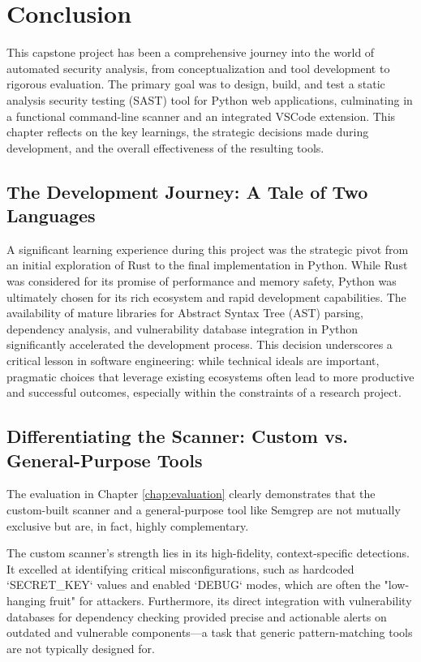 \chapter{Conclusion}
\label{chap:conclusion}

This capstone project has been a comprehensive journey into the world of automated security analysis, from conceptualization and tool development to rigorous evaluation. The primary goal was to design, build, and test a static analysis security testing (SAST) tool for Python web applications, culminating in a functional command-line scanner and an integrated VSCode extension. This chapter reflects on the key learnings, the strategic decisions made during development, and the overall effectiveness of the resulting tools.

\section{The Development Journey: A Tale of Two Languages}

A significant learning experience during this project was the strategic pivot from an initial exploration of Rust to the final implementation in Python. While Rust was considered for its promise of performance and memory safety, Python was ultimately chosen for its rich ecosystem and rapid development capabilities. The availability of mature libraries for Abstract Syntax Tree (AST) parsing, dependency analysis, and vulnerability database integration in Python significantly accelerated the development process. This decision underscores a critical lesson in software engineering: while technical ideals are important, pragmatic choices that leverage existing ecosystems often lead to more productive and successful outcomes, especially within the constraints of a research project.

\section{Differentiating the Scanner: Custom vs. General-Purpose Tools}

The evaluation in Chapter \ref{chap:evaluation} clearly demonstrates that the custom-built scanner and a general-purpose tool like Semgrep are not mutually exclusive but are, in fact, highly complementary.

The custom scanner's strength lies in its high-fidelity, context-specific detections. It excelled at identifying critical misconfigurations, such as hardcoded `SECRET_KEY` values and enabled `DEBUG` modes, which are often the "low-hanging fruit" for attackers. Furthermore, its direct integration with vulnerability databases for dependency checking provided precise and actionable alerts on outdated and vulnerable components—a task that generic pattern-matching tools are not typically designed for.

